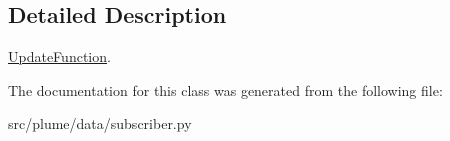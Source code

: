 \subsection{Detailed Description}
\hyperlink{classplume-creator_1_1src_1_1plume_1_1data_1_1subscriber_1_1_update_function}{Update\+Function}. 

The documentation for this class was generated from the following file\+:\begin{DoxyCompactItemize}
\item 
src/plume/data/subscriber.\+py\end{DoxyCompactItemize}
